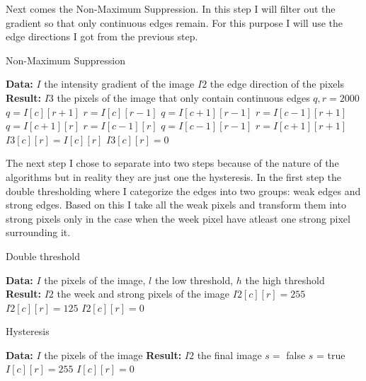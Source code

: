 Next comes the Non-Maximum Suppression. In this step I will filter out the gradient so that only continuous edges remain. For this purpose I will use the edge directions I got from the previous step.

\begin{algorithm}[H]
\caption{Non-Maximum Suppression}
\label{alg:max}
\begin{algorithmic}
\State \textbf{Data:} $I$ the intensity gradient of the image $I2$ the edge direction of the pixels 
\State \textbf{Result:} $I3$ the pixels of the image that only contain continuous edges
\State $q,r = 2000$
\State $q = I[c][r + 1]$
\State $r = I[c][r - 1]$
\State $q = I[c + 1][r - 1]$
\State $r = I[c - 1][r + 1]$
\State $q = I[c + 1][r]$
\State $r = I[c - 1][r]$
\State $q = I[c - 1][r - 1]$
\State $r = I[c + 1][r + 1]$
\EndIf
{}
\State $I3[c][r] = I[c][r]$
\Else
\State $I3[c][r] = 0$
\EndIf
\EndFor
\end{algorithmic}
\end{algorithm}

The next step I chose to separate into two steps because of the nature of the  algorithms but in reality they are just one the hysteresis. In the first step the double thresholding where I categorize the edges into two groups: weak edges and strong edges. Based on this I take all the weak pixels and transform them into strong pixels only in the case when the week pixel have atleast one strong pixel surrounding it.

\begin{algorithm}[H]
\caption{Double threshold}
\label{alg:thresh}
\begin{algorithmic}
\State \textbf{Data:} $I$ the pixels of the image, $l$ the low threshold, $h$ the high threshold
\State \textbf{Result:} $I2$ the week and strong pixels of the image
\State $I2[c][r] = 255$
\State $I2[c][r] = 125$
\Else
\State $I2[c][r] = 0$
\EndIf
\EndFor
\end{algorithmic}
\end{algorithm}

\begin{algorithm}[H]
\caption{Hysteresis}
\label{alg:hys}
\begin{algorithmic}
\State \textbf{Data:} $I$ the pixels of the image
\State \textbf{Result:} $I2$ the final image
\State $s =$ false
\State $s$ = true
\EndIf
\EndFor
\EndFor
{}
\State $I[c][r] = 255$
\Else
\State $I[c][r] = 0$
\EndIf
\EndFor
\end{algorithmic}
\end{algorithm}

